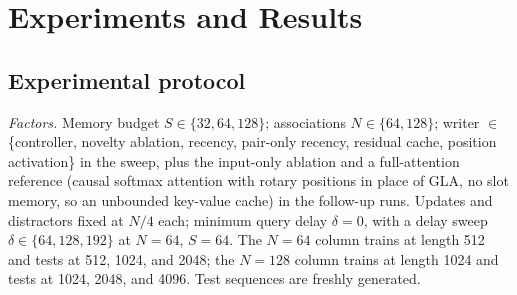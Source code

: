 \documentclass[conference]{IEEEtran}
\begin{document}
\section{Experiments and Results}
\label{sec:results}

\subsection{Experimental protocol}
\label{sec:protocol}

\textit{Factors.} Memory budget $S \in \{32, 64, 128\}$; associations $N \in
\{64, 128\}$; writer $\in$ \{controller, novelty ablation, recency, pair-only
recency, residual cache, position activation\} in the sweep, plus the input-only
ablation and a full-attention reference (causal softmax attention with rotary
positions in place of GLA, no slot memory, so an unbounded key-value cache)
in the follow-up runs. Updates and distractors fixed at $N/4$ each; minimum
query delay $\delta = 0$, with a delay sweep $\delta \in \{64, 128, 192\}$ at
$N = 64$, $S = 64$. The $N = 64$ column trains at length 512 and tests at 512,
1024, and 2048; the $N = 128$ column trains at length 1024 and tests at 1024,
2048, and 4096. Test sequences are freshly generated.
\end{document}
